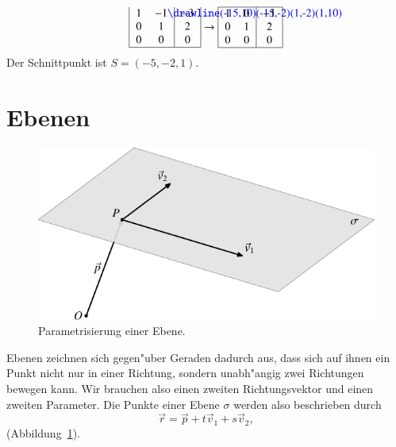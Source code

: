 \begin{beispiel}
\begin{align*}
\begin{tabular}{|>{$}c<{$}>{$}c<{$}|>{$}c<{$}|}
1&-1%
\begin{picture}(0,0)%
\color{blue}\drawline(-15,10)(-15,-2)(1,-2)(1,10)
\end{picture}%
&-3\\
0& 1& 2\\
0& 0& 0\\
\hline
\end{tabular}
\rightarrow
\begin{tabular}{|>{$}c<{$}>{$}c<{$}|>{$}c<{$}|}
\hline
1& 0&-1\\
0& 1& 2\\
0& 0& 0\\
\hline
\end{tabular}
\end{align*}
Der Schnittpunkt ist $S=(-5,-2,1)$.
\end{beispiel}

\section{Ebenen}
\begin{figure}
\begin{center}
\includegraphics{images/v-8}
\end{center}
\caption{Parametrisierung einer Ebene.\label{image-parametrisierungebene}}
\end{figure}%
Ebenen zeichnen sich gegen"uber Geraden dadurch aus, dass sich auf ihnen
ein Punkt nicht nur in einer Richtung, sondern unabh"angig zwei Richtungen
bewegen kann.
Wir brauchen also einen zweiten Richtungsvektor und einen zweiten Parameter.
Die Punkte einer Ebene $\sigma$ werden also beschrieben durch
\[
\vec r=\vec p+t\vec v_1+s\vec v_2,
\]
(Abbildung~\ref{image-parametrisierungebene}).

